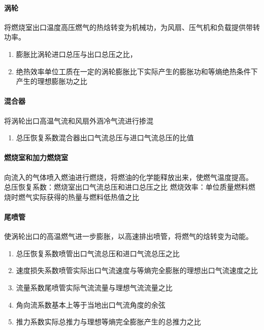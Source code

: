 \documentclass[12pt,a4paper]{report}
\begin{document}
\paragraph{涡轮} 将燃烧室出口温度高压燃气的热焓转变为机械功，为风扇、压气机和负载提供带转功率。

\begin{enumerate}
\item 膨胀比\textemdash 涡轮进口总压与出口总压之比，
\item 绝热效率\textemdash 单位工质在一定的涡轮膨胀比下实际产生的膨胀功和等熵绝热条件下产生的理想膨胀功之比
\end{enumerate}

\paragraph{混合器}将涡轮出口高温气流和风扇外涵冷气流进行掺混

\begin{enumerate}
\item 总压恢复系数\textemdash 混合器出口气流总压与进口气流总压的比值
\end{enumerate}

\paragraph{燃烧室和加力燃烧室} 向流入的气体喷入燃油进行燃烧，将燃油的化学能释放出来，使燃气温度提高。
	总压恢复系数：燃烧室出口气流总压和进口总压之比
	燃烧效率：单位质量燃料燃烧时燃气实际获得的热量与燃料低热值之比

\paragraph{尾喷管}使涡轮出口的高温燃气进一步膨胀，以高速排出喷管，将燃气的焓转变为动能。

\begin{enumerate}
\item 总压恢复系数\textemdash 喷管出口气流总压和进口气流总压之比
\item 速度损失系数\textemdash 喷管实际出口气流速度与等熵完全膨胀的理想出口气流速度之比
\item 流量系数\textemdash 尾喷管实际气流流量与理想气流流量之比
\item 角向流系数\textemdash 基本上等于当地出口气流角度的余弦
\item 推力系数\textemdash 实际总推力与理想等熵完全膨胀产生的总推力之比
\end{enumerate}
\end{document}
